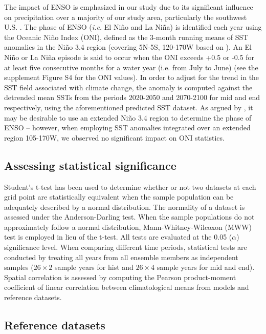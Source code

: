 \documentclass{ametsoc}
\begin{document}
The impact of ENSO is emphasized in our study due to its significant influence on precipitation over a majority of our study area, particularly the southwest U.S. \citep{cayan1999enso, zhang2010influence, deser2012communication, yoon2015increasing}. The phase of ENSO (\textit{i.e.} El Ni\~no and La Ni\~na) is identified each year using the Oceanic Ni\~no Index (ONI), defined as the 3-month running means of SST anomalies in the Ni\~no 3.4 region (covering 5N-5S, 120-170W based on \cite{noaaElNino}). An El Ni\~no or La Ni\~na episode is said to occur when the ONI exceeds +0.5 or -0.5 for at least five consecutive months for a water year (i.e. from July to June) \citep{noaaElNino} (see the supplement Figure S4 for the ONI values). In order to adjust for the trend in the SST field associated with climate change, the anomaly is computed against the detrended mean SSTs from the periods 2020-2050 and 2070-2100 for \textsf{mid} and \textsf{end} respectively, using the aforementioned predicted SST dataset. As argued by \cite{kao2009contrasting}, it may be desirable to use an extended Ni\~no 3.4 region to determine the phase of ENSO -- however, when employing SST anomalies integrated over an extended region 105-170W, we observed no significant impact on ONI statistics.


\subsection{Assessing statistical significance}

Student's t-test has been used to determine whether or not two datasets at each grid point are statistically equivalent when the sample population can be adequately described by a normal distribution. The normality of a dataset is assessed under the Anderson-Darling test. When the sample populations do not approximately follow a normal distribution, Mann-Whitney-Wilcoxon (MWW) test is employed in lieu of the t-test. All tests are evaluated at the 0.05 ($\alpha$) significance level. When comparing different time periods, statistical tests are conducted by treating all years from all ensemble members as independent samples ($26 \times 2$ sample years for \textsf{hist} and $26 \times 4$ sample years for \textsf{mid} and \textsf{end}). Spatial correlation is assessed by computing the Pearson product-moment coefficient of linear correlation between climatological means from models and reference datasets.


\subsection{Reference datasets}
\end{document}
